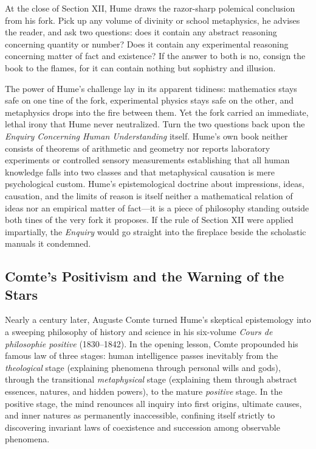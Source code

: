 At the close of Section XII, Hume draws the razor-sharp polemical conclusion from his fork. Pick up any volume of divinity or school metaphysics, he advises the reader, and ask two questions: does it contain any abstract reasoning concerning quantity or number? Does it contain any experimental reasoning concerning matter of fact and existence? If the answer to both is no, consign the book to the flames, for it can contain nothing but sophistry and illusion.

The power of Hume's challenge lay in its apparent tidiness: mathematics stays safe on one tine of the fork, experimental physics stays safe on the other, and metaphysics drops into the fire between them. Yet the fork carried an immediate, lethal irony that Hume never neutralized. Turn the two questions back upon the \emph{Enquiry Concerning Human Understanding} itself. Hume's own book neither consists of theorems of arithmetic and geometry nor reports laboratory experiments or controlled sensory measurements establishing that all human knowledge falls into two classes and that metaphysical causation is mere psychological custom. Hume's epistemological doctrine about impressions, ideas, causation, and the limits of reason is itself neither a mathematical relation of ideas nor an empirical matter of fact---it is a piece of philosophy standing outside both tines of the very fork it proposes. If the rule of Section XII were applied impartially, the \emph{Enquiry} would go straight into the fireplace beside the scholastic manuals it condemned.

\subsection{Comte's Positivism and the Warning of the Stars}

Nearly a century later, Auguste Comte turned Hume's skeptical epistemology into a sweeping philosophy of history and science in his six-volume \emph{Cours de philosophie positive} (1830--1842). In the opening lesson, Comte propounded his famous law of three stages: human intelligence passes inevitably from the \emph{theological} stage (explaining phenomena through personal wills and gods), through the transitional \emph{metaphysical} stage (explaining them through abstract essences, natures, and hidden powers), to the mature \emph{positive} stage. In the positive stage, the mind renounces all inquiry into first origins, ultimate causes, and inner natures as permanently inaccessible, confining itself strictly to discovering invariant laws of coexistence and succession among observable phenomena.

